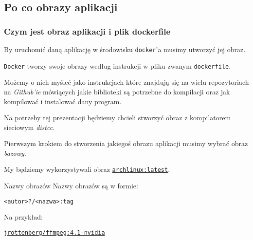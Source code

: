 \documentclass{beamer}
\begin{document}
\subsection{Po co obrazy aplikacji}
\begin{frame}
    \frametitle{Czym jest obraz aplikacji i plik dockerfile}
    By uruchomić daną aplikację w środowisku \texttt{docker}'a musimy utworzyć jej obraz.
    \pause

    \hspace{5mm}

        \texttt{Docker} tworzy swoje obrazy według instrukcji w pliku zwanym \texttt{dockerfile}.
        
    \pause
    \hspace{5mm}

        Możemy o nich myśleć jako instrukcjach które znajdują się na wielu repozytoriach na \emph{Github'ie} mówiących jakie biblioteki są potrzebne do kompilacji oraz jak kompilować i instalować dany program.
\end{frame}
\begin{frame}
    Na potrzeby tej prezentacji będziemy chcieli stworzyć obraz z kompilatorem sieciowym \emph{distcc}.

    \pause
    \vspace{5mm}
    Pierwszym krokiem do stworzenia jakiegoś obrazu aplikacji musimy wybrać obraz \emph{bazowy}.

    \pause
    \vspace{5mm}
    My będziemy wykorzystywali obraz \texttt{\href{https://hub.docker.com/_/archlinux/}{archlinux:latest}}.
    \pause
    \begin{block}{Nazwy obrazów}
        Nazwy obrazów są w formie:
        \vspace{-3mm}
        \begin{center}
            \texttt{<autor>?/<nazwa>:tag}
        \end{center}
        Na przykład:
        \vspace{-3mm}
        \begin{center}
            \href{https://hub.docker.com/r/jrottenberg/ffmpeg/}{\texttt{jrottenberg/ffmpeg:4.1-nvidia}}
        \end{center}
    \end{block}
\end{frame}
\end{document}
